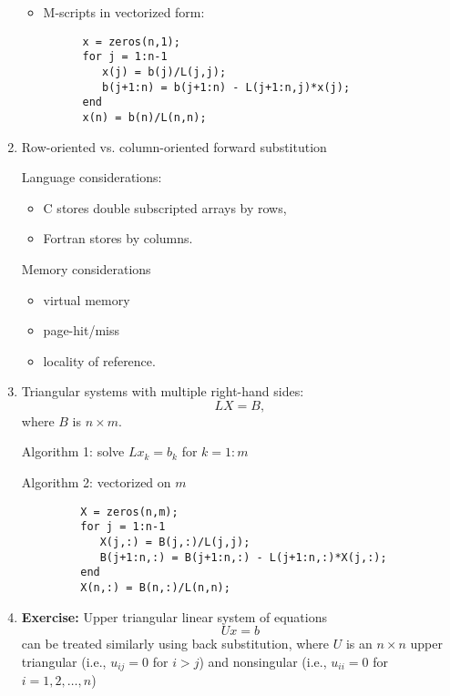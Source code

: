 \documentclass[11pt]{article}
\begin{document}
\begin{enumerate}
\begin{itemize}

\item M-scripts in vectorized form:
\begin{verbatim}
      x = zeros(n,1); 
      for j = 1:n-1
         x(j) = b(j)/L(j,j); 
         b(j+1:n) = b(j+1:n) - L(j+1:n,j)*x(j);
      end 
      x(n) = b(n)/L(n,n); 
\end{verbatim}

\end{itemize} 


\item Row-oriented vs. column-oriented forward substitution

      Language considerations: 
      \begin{itemize} 
      \item C stores double subscripted arrays by rows, 
      \item Fortran stores by columns. 
      \end{itemize} 

      Memory considerations
      \begin{itemize} 
      \item virtual memory 
      \item page-hit/miss
      \item locality of reference.   
      \end{itemize} 

\item Triangular systems with multiple right-hand sides: 
      $$ L X = B,$$
      where $B$ is $n \times m$. 

      Algorithm 1: solve $L x_k = b_k$ for $k = 1:m$   

      Algorithm 2: vectorized on $m$
      \begin{verbatim} 
         X = zeros(n,m); 
         for j = 1:n-1
            X(j,:) = B(j,:)/L(j,j);
            B(j+1:n,:) = B(j+1:n,:) - L(j+1:n,:)*X(j,:); 
         end
         X(n,:) = B(n,:)/L(n,n); 
      \end{verbatim} 
\vspace{-.3in}

\item {\bf Exercise:} Upper triangular linear system of equations  
$$U x = b$$ 
can be treated similarly using back substitution, 
where $U$ is an $n \times n$ upper triangular (i.e., $u_{ij} = 0$ for $i >j$)
and nonsingular (i.e., $u_{ii} = 0$ for $i = 1, 2, \ldots, n$)

\end{enumerate}
\end{document}
